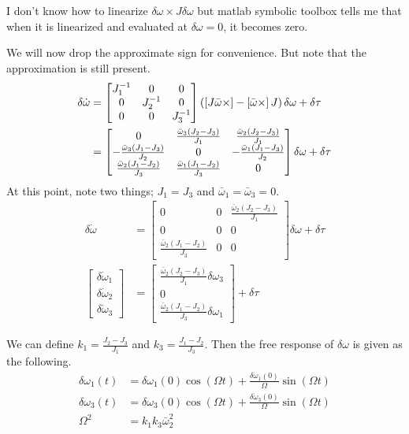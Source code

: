 \documentclass[]{article}
\begin{document}
I don't know how to linearize $\delta \omega \times J \delta \omega$ but matlab symbolic toolbox tells me that when it is linearized and evaluated at $\delta \omega = 0$, it becomes zero.

We will now drop the approximate sign for convenience. But note that the approximation is still present.
\begin{align}
	\delta \dot{\omega} & = \begin{bmatrix}
	J_1^{-1} & 0 & 0 \\
	0 & J_2^{-1} & 0 \\
	0 & 0 & J_3^{-1}
	\end{bmatrix} \left( \left[ J \bar{\omega} \times \right] - \left[ \bar{\omega} \times \right] J \right) \delta \omega + \delta \tau \\
	& = \begin{bmatrix}
	0 & \frac{\bar{\omega}_3(J_2 - J_3)}{J_1} & \frac{\bar{\omega}_2(J_2 - J_3)}{J_1} \\
	-\frac{\bar{\omega}_3(J_1 - J_3)}{J_2} & 0 & -\frac{\bar{\omega}_1(J_1 - J_3)}{J_2} \\
	\frac{\bar{\omega}_2(J_1 - J_2)}{J_3} & \frac{\bar{\omega}_1(J_1 - J_2)}{J_3} & 0
	\end{bmatrix} \delta \omega + \delta \tau
\end{align}
At this point, note two things; $J_1 = J_3$ and $\bar{\omega}_1 = \bar{\omega}_3 = 0$.
\begin{align}
\delta \dot{\omega} & = \begin{bmatrix}
0 & 0 & \frac{\bar{\omega}_2(J_2 - J_3)}{J_1} \\
0 & 0 & 0 \\
\frac{\bar{\omega}_2(J_1 - J_2)}{J_3} & 0 & 0
\end{bmatrix} \delta \omega + \delta \tau \\
\begin{bmatrix}
\delta \dot{\omega}_1 \\
\delta \dot{\omega}_2 \\
\delta \dot{\omega}_3
\end{bmatrix} & = \begin{bmatrix}
\frac{\bar{\omega}_2(J_2 - J_3)}{J_1} \delta \omega_3 \\
0 \\
\frac{\bar{\omega}_2(J_1 - J_2)}{J_3} \delta \omega_1
\end{bmatrix} + \delta \tau
\end{align}

We can define $k_1 = \frac{J_2 - J_3}{J_1}$ and $k_3 = \frac{J_1 - J_2}{J_3}$. Then the free response of $\delta \omega$ is given as the following.
\begin{align}
	\delta \omega_1 (t) & = \delta \omega_1(0) \cos(\Omega t) + \frac{\delta \dot{\omega}_1 (0)}{\Omega} \sin(\Omega t) \\
	\delta \omega_3 (t) & = \delta \omega_3(0) \cos(\Omega t) + \frac{\delta \dot{\omega}_3 (0)}{\Omega} \sin(\Omega t) \\
	\Omega^2 & = k_1 k_3 \bar{\omega}_2^2
\end{align}
\end{document}
